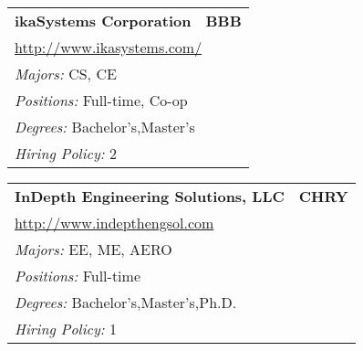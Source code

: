 \documentclass[twoside]{article}
\begin{document}
\begin{center}
\begin{multicols}{3}
\begin{FlushLeft}
\begin{minipage}{.9\columnwidth}
\end{minipage}
 
\begin{minipage}{.9\columnwidth}\begin{tabularx}{.95\columnwidth}{Xr}
                 {\Large\bf ikaSystems Corporation} & {\Large\bf BBB}\\
    \multicolumn{2}{p{.95\columnwidth}}{\url{http://www.ikasystems.com/}}\\
    \multicolumn{2}{p{.95\columnwidth}}{\emph{Majors:} CS, CE}\\
    \multicolumn{2}{p{.95\columnwidth}}{\emph{Positions:} Full-time, Co-op}\\
    \multicolumn{2}{p{.95\columnwidth}}{\emph{Degrees:} Bachelor's,Master's}\\
    \multicolumn{2}{p{.95\columnwidth}}{\emph{Hiring Policy:} 2}\\
    \end{tabularx}
    
\end{minipage}
 
\begin{minipage}{.9\columnwidth}\begin{tabularx}{.95\columnwidth}{Xr}
                 {\Large\bf InDepth Engineering Solutions, LLC} & {\Large\bf CHRY}\\
    \multicolumn{2}{p{.95\columnwidth}}{\url{http://www.indepthengsol.com}}\\
    \multicolumn{2}{p{.95\columnwidth}}{\emph{Majors:} EE, ME, AERO}\\
    \multicolumn{2}{p{.95\columnwidth}}{\emph{Positions:} Full-time}\\
    \multicolumn{2}{p{.95\columnwidth}}{\emph{Degrees:} Bachelor's,Master's,Ph.D.}\\
    \multicolumn{2}{p{.95\columnwidth}}{\emph{Hiring Policy:} 1}\\
    \end{tabularx}
    
\end{minipage}
 

\end{FlushLeft}
\end{multicols}
\end{center}
\end{document}
